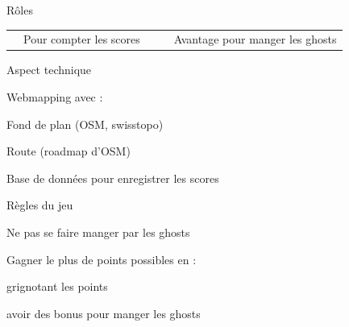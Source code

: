 \documentclass{beamer}
\begin{document}
\begin{frame}{Rôles}
\begin{table}
\begin{tabular}{lp{2cm}p{0.5cm}lp{2cm}}
                                                                                 & {\footnotesize Pour compter les scores} & &                                                               & {\footnotesize Avantage pour manger les ghosts}             \\
            \end{tabular}
    \end{table}
\end{frame}

\begin{frame}{Aspect technique}
    \begin{outline}
        \item Webmapping avec :
        \begin{outline}
            \item Fond de plan (OSM, swisstopo)
            \item Route (roadmap d'OSM)
        \end{outline}
        \item Base de données pour enregistrer les scores
    \end{outline}
\end{frame}

\begin{frame}{Règles du jeu}
    \begin{outline}
        \item Ne pas se faire manger par les ghosts
        \item Gagner le plus de points possibles en :
        \begin{outline}
            \item grignotant les points
            \item avoir des bonus pour manger les ghosts
        \end{outline}
    \end{outline}
\end{frame}
\end{document}
